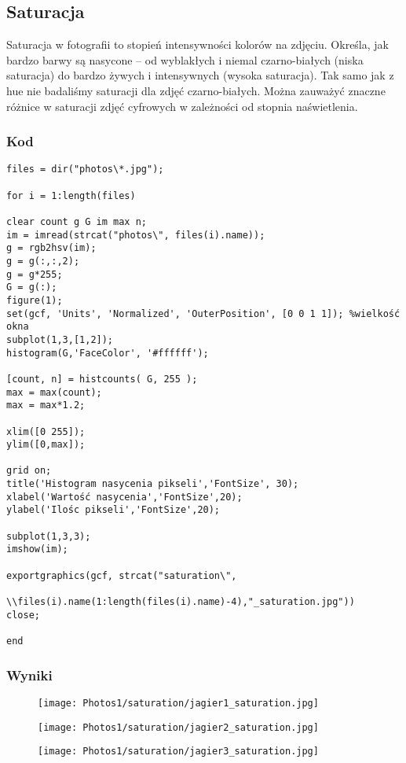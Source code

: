 \documentclass[]{mwart}
\begin{document}
\newpage
\subsection{Saturacja}
Saturacja w fotografii to stopień intensywności kolorów na zdjęciu. Określa,
jak bardzo barwy są nasycone -- od wyblakłych i niemal czarno-białych (niska
saturacja) do bardzo żywych i intensywnych (wysoka saturacja). Tak samo jak z
hue nie badaliśmy saturacji dla zdjęć czarno-białych. Można zauważyć znaczne
różnice w saturacji zdjęć cyfrowych w zależności od stopnia naświetlenia.

\subsubsection{Kod}
\begin{verbatim}
files = dir("photos\*.jpg");

for i = 1:length(files)

clear count g G im max n;
im = imread(strcat("photos\", files(i).name));
g = rgb2hsv(im);
g = g(:,:,2);
g = g*255;
G = g(:);
figure(1);
set(gcf, 'Units', 'Normalized', 'OuterPosition', [0 0 1 1]); %wielkość okna
subplot(1,3,[1,2]); 
histogram(G,'FaceColor', '#ffffff');

[count, n] = histcounts( G, 255 );
max = max(count);
max = max*1.2;

xlim([0 255]);
ylim([0,max]);

grid on;
title('Histogram nasycenia pikseli','FontSize', 30);
xlabel('Wartość nasycenia','FontSize',20);
ylabel('Ilośc pikseli','FontSize',20);

subplot(1,3,3);
imshow(im);

exportgraphics(gcf, strcat("saturation\", 
            \\files(i).name(1:length(files(i).name)-4),"_saturation.jpg"))
close;

end

\end{verbatim}

\newpage
\subsubsection{Wyniki}


\begin{figure}[H]
    \centering
    \texttt{[image: Photos1/saturation/jagier1\_saturation.jpg]}

\end{figure}
\begin{figure}[H]
    \centering
    \texttt{[image: Photos1/saturation/jagier2\_saturation.jpg]}

\end{figure}
\begin{figure}[H]
    \centering
    \texttt{[image: Photos1/saturation/jagier3\_saturation.jpg]}

\end{figure}
\end{document}
